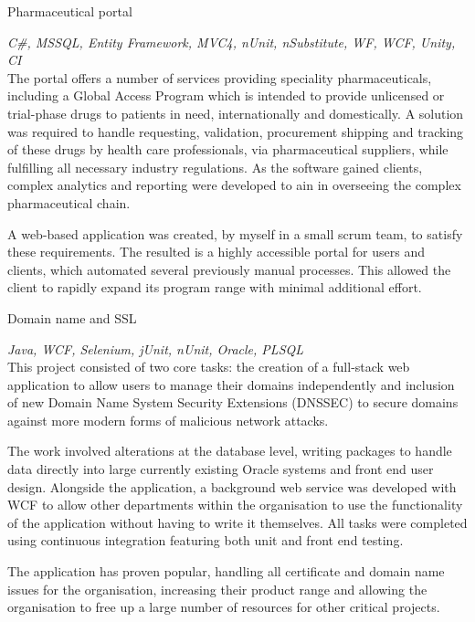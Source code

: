 \documentclass[]{friggeri-cv} %
\begin{document}
\begin{entrylist}
\projectentry
{Pharmaceutical portal}
{\emph{C\#, MSSQL, Entity Framework, MVC4, nUnit, nSubstitute, WF, WCF, Unity, CI} \\
The portal offers a number of services providing speciality pharmaceuticals, including a Global Access Program which is intended to provide unlicensed or trial-phase drugs to patients in need, internationally and domestically. A solution was required to handle requesting, validation, procurement shipping and tracking of these drugs by health care professionals, via pharmaceutical suppliers, while fulfilling all necessary industry regulations. As the software gained clients, complex analytics and reporting were developed to ain in overseeing the complex pharmaceutical chain.

A web-based application was created, by myself in a small scrum team, to satisfy these requirements. The resulted is a highly accessible portal for users and clients, which automated several previously manual processes. This allowed the client to rapidly expand its program range with minimal additional effort.}
\end{entrylist}

\begin{entrylist}
\projectentry
{Domain name and SSL}
{\emph{Java, WCF, Selenium, jUnit, nUnit, Oracle, PLSQL } \\
This project consisted of two core tasks: the creation of a full-stack web application to allow users to manage their domains independently and inclusion of new Domain Name System Security Extensions (DNSSEC) to secure domains against more modern forms of malicious network attacks.

The work involved alterations at the database level, writing packages to handle data directly into large currently existing Oracle systems  and front end user design. Alongside the application, a background web service was developed with WCF to allow other departments within the organisation to use the functionality of the application without having to write it themselves. All tasks were completed using continuous integration featuring both unit and front end testing.

The application has proven popular, handling all certificate and domain name issues for the organisation, increasing their product range and allowing the organisation to free up a large number of resources for other critical projects.}
\end{entrylist}
\end{document}
